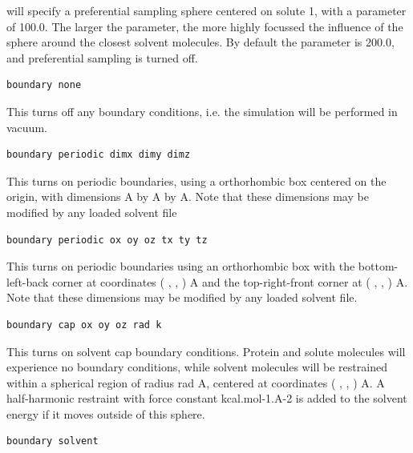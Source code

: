 \documentclass[letterpaper,10pt,english]{sphinxmanual}
\begin{document}
will specify a preferential sampling sphere centered on solute 1, with a parameter of 100.0. The larger the parameter, the more highly focussed the influence of the sphere around the closest solvent molecules. By default the parameter is 200.0, and preferential sampling is turned off.

\begin{Verbatim}[commandchars=\\\{\}]
boundary none
\end{Verbatim}

This turns off any boundary conditions, i.e. the simulation will be performed in vacuum.

\begin{Verbatim}[commandchars=\\\{\}]
boundary periodic dimx dimy dimz
\end{Verbatim}

This turns on periodic boundaries, using a orthorhombic box centered on the origin, with dimensions  A by  A by  A. Note that these dimensions may be modified by any loaded solvent file

\begin{Verbatim}[commandchars=\\\{\}]
boundary periodic ox oy oz tx ty tz
\end{Verbatim}

This turns on periodic boundaries using an orthorhombic box with the bottom-left-back corner at coordinates ( ,  , ) A and the top-right-front corner at ( ,  , ) A. Note that these dimensions may be modified by any loaded solvent file.

\begin{Verbatim}[commandchars=\\\{\}]
boundary cap ox oy oz rad k
\end{Verbatim}

This turns on solvent cap boundary conditions. Protein and solute molecules will experience no boundary conditions, while solvent molecules will be restrained within a spherical region of radius rad A, centered at coordinates ( ,  , ) A. A half-harmonic restraint with force constant  kcal.mol-1.A-2 is added to the solvent energy if it moves outside of this sphere.

\begin{Verbatim}[commandchars=\\\{\}]
boundary solvent
\end{Verbatim}
\end{document}
